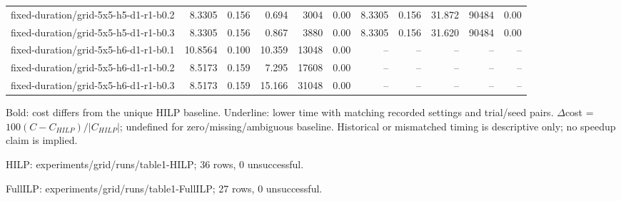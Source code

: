 \documentclass[10pt]{article}
\begin{document}
\begin{tabular}{p{65mm}rrrrrrrrrr}
fixed-\allowbreak duration/\allowbreak grid-\allowbreak 5x5-\allowbreak h5-\allowbreak d1-\allowbreak r1-\allowbreak b0.2 & 8.3305 & 0.156 & 0.694 & 3004 & 0.00 & 8.3305 & 0.156 & 31.872 & 90484 & 0.00 \\
fixed-\allowbreak duration/\allowbreak grid-\allowbreak 5x5-\allowbreak h5-\allowbreak d1-\allowbreak r1-\allowbreak b0.3 & 8.3305 & 0.156 & 0.867 & 3880 & 0.00 & 8.3305 & 0.156 & 31.620 & 90484 & 0.00 \\
fixed-\allowbreak duration/\allowbreak grid-\allowbreak 5x5-\allowbreak h6-\allowbreak d1-\allowbreak r1-\allowbreak b0.1 & 10.8564 & 0.100 & 10.359 & 13048 & 0.00 & -- & -- & -- & -- & -- \\
fixed-\allowbreak duration/\allowbreak grid-\allowbreak 5x5-\allowbreak h6-\allowbreak d1-\allowbreak r1-\allowbreak b0.2 & 8.5173 & 0.159 & 7.295 & 17608 & 0.00 & -- & -- & -- & -- & -- \\
fixed-\allowbreak duration/\allowbreak grid-\allowbreak 5x5-\allowbreak h6-\allowbreak d1-\allowbreak r1-\allowbreak b0.3 & 8.5173 & 0.159 & 15.166 & 31048 & 0.00 & -- & -- & -- & -- & -- \\
\bottomrule\end{tabular}\par
\medskip\footnotesize
Bold: cost differs from the unique HILP baseline. Underline: lower time with matching recorded settings and trial/seed pairs. $\Delta$cost = $100(C-C_{HILP})/|C_{HILP}|$; undefined for zero/missing/ambiguous baseline. Historical or mismatched timing is descriptive only; no speedup claim is implied.\par
HILP: experiments/grid/runs/table1-HILP; 36 rows, 0 unsuccessful.\par
FullILP: experiments/grid/runs/table1-FullILP; 27 rows, 0 unsuccessful.\par
\clearpage
\end{document}

